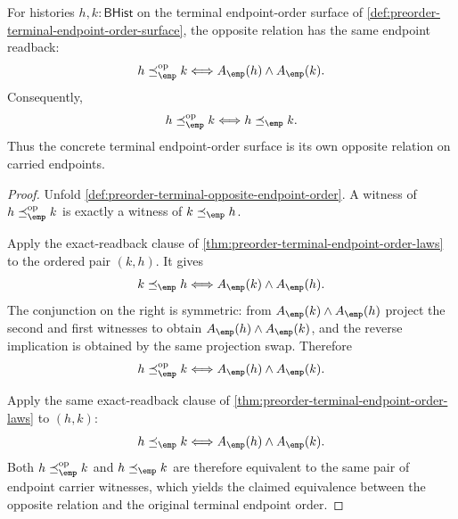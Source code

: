 \begin{theorem}
\label{thm:preorder-terminal-endpoint-order-opposite-self-dual}
For histories $h,k:\mathsf{BHist}$ on the terminal endpoint-order surface of
\autoref{def:preorder-terminal-endpoint-order-surface}, the opposite relation
has the same endpoint readback:
$$
h\preceq_{\emp}^{\mathrm{op}} k
\Longleftrightarrow
A_{\emp}(h)\land A_{\emp}(k).
$$
Consequently,
$$
h\preceq_{\emp}^{\mathrm{op}} k
\Longleftrightarrow
h\preceq_{\emp} k.
$$
Thus the concrete terminal endpoint-order surface is its own opposite relation
on carried endpoints.
\end{theorem}
\begin{proof}
Unfold \autoref{def:preorder-terminal-opposite-endpoint-order}. A witness of
$h\preceq_{\emp}^{\mathrm{op}} k$ is exactly a witness of
$k\preceq_{\emp} h$.

Apply the exact-readback clause of
\autoref{thm:preorder-terminal-endpoint-order-laws} to the ordered pair
$(k,h)$. It gives
$$
k\preceq_{\emp}h
\Longleftrightarrow
A_{\emp}(k)\land A_{\emp}(h).
$$
The conjunction on the right is symmetric: from
$A_{\emp}(k)\land A_{\emp}(h)$ project the second and first witnesses to obtain
$A_{\emp}(h)\land A_{\emp}(k)$, and the reverse implication is obtained by the
same projection swap. Therefore
$$
h\preceq_{\emp}^{\mathrm{op}} k
\Longleftrightarrow
A_{\emp}(h)\land A_{\emp}(k).
$$

Apply the same exact-readback clause of
\autoref{thm:preorder-terminal-endpoint-order-laws} to $(h,k)$:
$$
h\preceq_{\emp}k
\Longleftrightarrow
A_{\emp}(h)\land A_{\emp}(k).
$$
Both $h\preceq_{\emp}^{\mathrm{op}} k$ and $h\preceq_{\emp}k$ are therefore
equivalent to the same pair of endpoint carrier witnesses, which yields the
claimed equivalence between the opposite relation and the original terminal
endpoint order.
\end{proof}
